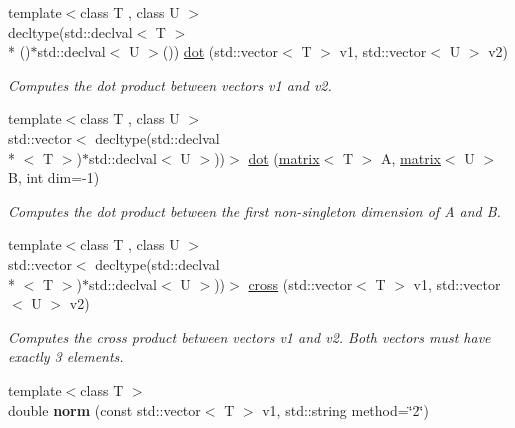 \begin{DoxyCompactItemize}
\item 
\hypertarget{namespacekeycpp_abcee2445c0961997ba6e9d16070b2f8b}{{\footnotesize template$<$class T , class U $>$ }\\decltype(std\-::declval$<$ T $>$\\*
()$\ast$std\-::declval$<$ U $>$()) \hyperlink{namespacekeycpp_abcee2445c0961997ba6e9d16070b2f8b}{dot} (std\-::vector$<$ T $>$ v1, std\-::vector$<$ U $>$ v2)}\label{namespacekeycpp_abcee2445c0961997ba6e9d16070b2f8b}

\begin{DoxyCompactList}\small\item\em Computes the dot product between vectors v1 and v2. \end{DoxyCompactList}\item 
\hypertarget{namespacekeycpp_a52f48322f62e9bf11da0acb06deadd63}{{\footnotesize template$<$class T , class U $>$ }\\std\-::vector$<$ decltype(std\-::declval\\*
$<$ T $>$)$\ast$std\-::declval$<$ U $>$))$>$ \hyperlink{namespacekeycpp_a52f48322f62e9bf11da0acb06deadd63}{dot} (\hyperlink{classkeycpp_1_1matrix}{matrix}$<$ T $>$ A, \hyperlink{classkeycpp_1_1matrix}{matrix}$<$ U $>$ B, int dim=-\/1)}\label{namespacekeycpp_a52f48322f62e9bf11da0acb06deadd63}

\begin{DoxyCompactList}\small\item\em Computes the dot product between the first non-\/singleton dimension of A and B. \end{DoxyCompactList}\item 
\hypertarget{namespacekeycpp_a1013b624bcc27f0953dfb989bacfe446}{{\footnotesize template$<$class T , class U $>$ }\\std\-::vector$<$ decltype(std\-::declval\\*
$<$ T $>$)$\ast$std\-::declval$<$ U $>$))$>$ \hyperlink{namespacekeycpp_a1013b624bcc27f0953dfb989bacfe446}{cross} (std\-::vector$<$ T $>$ v1, std\-::vector$<$ U $>$ v2)}\label{namespacekeycpp_a1013b624bcc27f0953dfb989bacfe446}

\begin{DoxyCompactList}\small\item\em Computes the cross product between vectors v1 and v2. Both vectors must have exactly 3 elements. \end{DoxyCompactList}\item 
\hypertarget{namespacekeycpp_aa01035a2b2a07cd56c5e36d5f289b2ee}{{\footnotesize template$<$class T $>$ }\\double {\bfseries norm} (const std\-::vector$<$ T $>$ v1, std\-::string method=\char`\"{}2\char`\"{})}\label{namespacekeycpp_aa01035a2b2a07cd56c5e36d5f289b2ee}


\end{DoxyCompactItemize}
